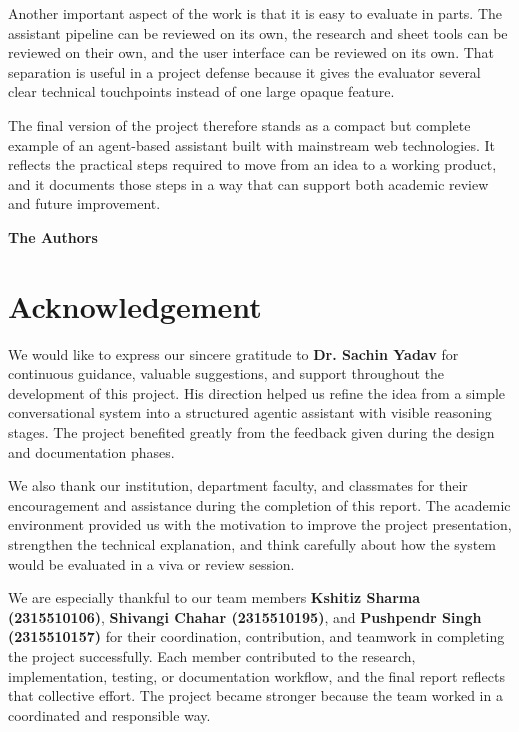 \documentclass[11pt,oneside]{report}
\newcommand{\GuideName}{Dr. Sachin Yadav}
\newcommand{\TeamMemberOne}{Kshitiz Sharma (2315510106)}
\newcommand{\TeamMemberTwo}{Shivangi Chahar (2315510195)}
\newcommand{\TeamMemberThree}{Pushpendr Singh (2315510157)}
\begin{document}
Another important aspect of the work is that it is easy to evaluate in parts. The assistant pipeline can be reviewed on its own, the research and sheet tools can be reviewed on their own, and the user interface can be reviewed on its own. That separation is useful in a project defense because it gives the evaluator several clear technical touchpoints instead of one large opaque feature.

The final version of the project therefore stands as a compact but complete example of an agent-based assistant built with mainstream web technologies. It reflects the practical steps required to move from an idea to a working product, and it documents those steps in a way that can support both academic review and future improvement.



\vfill
\begin{flushright}
\textbf{The Authors}
\end{flushright}

\chapter*{Acknowledgement}
We would like to express our sincere gratitude to \textbf{\GuideName{}} for continuous guidance, valuable suggestions, and support throughout the development of this project. His direction helped us refine the idea from a simple conversational system into a structured agentic assistant with visible reasoning stages. The project benefited greatly from the feedback given during the design and documentation phases.

We also thank our institution, department faculty, and classmates for their encouragement and assistance during the completion of this report. The academic environment provided us with the motivation to improve the project presentation, strengthen the technical explanation, and think carefully about how the system would be evaluated in a viva or review session.

We are especially thankful to our team members \textbf{\TeamMemberOne{}}, \textbf{\TeamMemberTwo{}}, and \textbf{\TeamMemberThree{}} for their coordination, contribution, and teamwork in completing the project successfully. Each member contributed to the research, implementation, testing, or documentation workflow, and the final report reflects that collective effort. The project became stronger because the team worked in a coordinated and responsible way.
\end{document}
